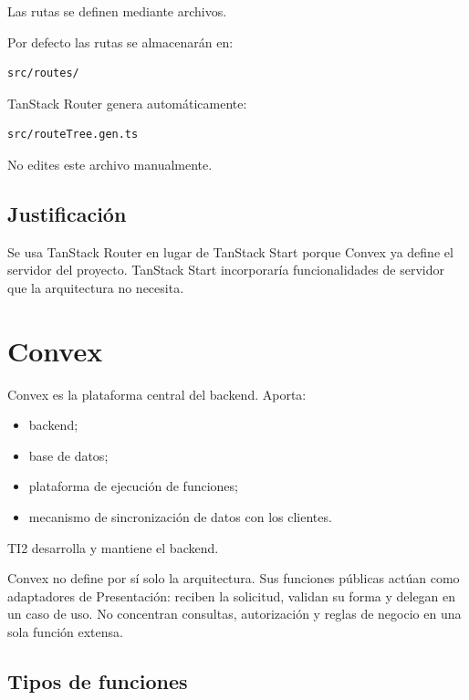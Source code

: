 \documentclass[11pt,a4paper]{article}
\begin{document}
Las rutas se definen mediante archivos.

Por defecto las rutas se almacenarán en:

\begin{lstlisting}
src/routes/
\end{lstlisting}

TanStack Router genera automáticamente:

\begin{lstlisting}
src/routeTree.gen.ts
\end{lstlisting}

No edites este archivo manualmente.

\subsection{Justificación}

Se usa TanStack Router en lugar de TanStack Start porque Convex ya define el
servidor del proyecto. TanStack Start incorporaría funcionalidades de servidor
que la arquitectura no necesita.

\section{Convex}

Convex es la plataforma central del backend. Aporta:

\begin{itemize}
  \item backend;
  \item base de datos;
  \item plataforma de ejecución de funciones;
  \item mecanismo de sincronización de datos con los clientes.
\end{itemize}

TI2 desarrolla y mantiene el backend.

Convex no define por sí solo la arquitectura. Sus funciones públicas actúan
como adaptadores de Presentación: reciben la solicitud, validan su forma y
delegan en un caso de uso. No concentran consultas, autorización y reglas de
negocio en una sola función extensa.

\subsection{Tipos de funciones}
\end{document}

